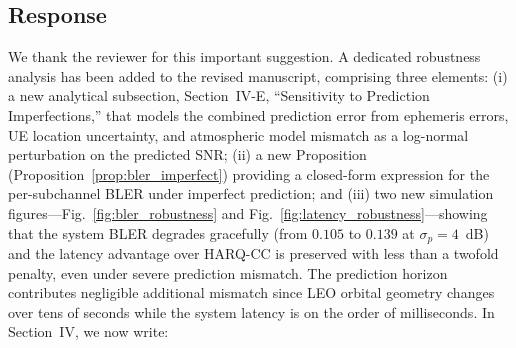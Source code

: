 \subsection{Response}

We thank the reviewer for this important suggestion. A dedicated robustness analysis has been added to the revised manuscript, comprising three elements: (i) a new analytical subsection, Section~IV-E, ``Sensitivity to Prediction Imperfections,'' that models the combined prediction error from ephemeris errors, UE location uncertainty, and atmospheric model mismatch as a log-normal perturbation on the predicted SNR; (ii) a new Proposition (Proposition~\ref{prop:bler_imperfect}) providing a closed-form expression for the per-subchannel BLER under imperfect prediction; and (iii) two new simulation figures---Fig.~\ref{fig:bler_robustness} and Fig.~\ref{fig:latency_robustness}---showing that the system BLER degrades gracefully (from $0.105$ to $0.139$ at $\sigma_p = 4$~dB) and the latency advantage over HARQ-CC is preserved with less than a twofold penalty, even under severe prediction mismatch. The prediction horizon contributes negligible additional mismatch since LEO orbital geometry changes over tens of seconds while the system latency is on the order of milliseconds. In Section~IV, we now write:

